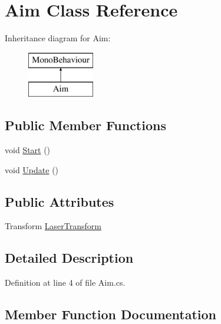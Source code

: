 \hypertarget{class_aim}{}\section{Aim Class Reference}
\label{class_aim}
Inheritance diagram for Aim\+:\begin{figure}[H]
\begin{center}
\leavevmode
\includegraphics[height=2.000000cm]{class_aim}
\end{center}
\end{figure}
\subsection*{Public Member Functions}
\begin{DoxyCompactItemize}
\item 
void \mbox{\hyperlink{class_aim_a0ac97301ab74d52416af371175bc5781}{Start}} ()
\item 
void \mbox{\hyperlink{class_aim_af6492a8eb4afae08a066e0e670d9dd19}{Update}} ()
\end{DoxyCompactItemize}
\subsection*{Public Attributes}
\begin{DoxyCompactItemize}
\item 
Transform \mbox{\hyperlink{class_aim_a7c3f5059710fa92c6f4d6442939103c8}{Laser\+Transform}}
\end{DoxyCompactItemize}


\subsection{Detailed Description}


Definition at line 4 of file Aim.\+cs.



\subsection{Member Function Documentation}
\mbox{\label{class_aim_a0ac97301ab74d52416af371175bc5781}} 
